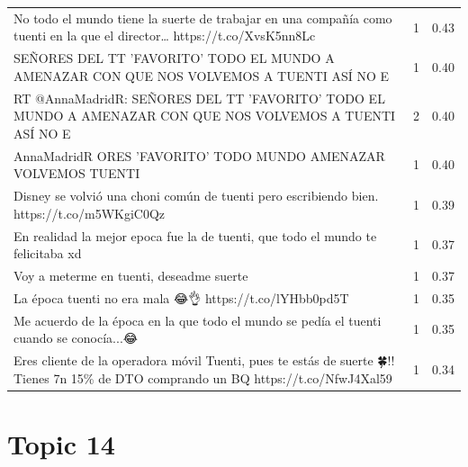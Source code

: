 \begin{longtable}{p{12.5cm}rr}
No todo el mundo tiene la suerte de trabajar en una compañía como tuenti en la que el director… https://t.co/XvsK5nn8Lc & 1 & 0.43 \\
SEÑORES DEL TT 'FAVORITO' TODO EL MUNDO A AMENAZAR CON QUE NOS VOLVEMOS A TUENTI ASÍ NO E & 1 & 0.40 \\
RT @AnnaMadridR: SEÑORES DEL TT 'FAVORITO' TODO EL MUNDO A AMENAZAR CON QUE NOS VOLVEMOS A TUENTI ASÍ NO E & 2 & 0.40 \\
AnnaMadridR ORES 'FAVORITO' TODO MUNDO AMENAZAR VOLVEMOS TUENTI & 1 & 0.40 \\
Disney se volvió una choni común de tuenti pero escribiendo bien. https://t.co/m5WKgiC0Qz & 1 & 0.39 \\
En realidad la mejor epoca fue la de tuenti, que todo el mundo te felicitaba xd & 1 & 0.37 \\
Voy a meterme en tuenti, deseadme suerte & 1 & 0.37 \\
La época tuenti no era mala 😂👌 https://t.co/lYHbb0pd5T & 1 & 0.35 \\
Me acuerdo de la época en la que todo el mundo se pedía el tuenti cuando se conocía...😂 & 1 & 0.35 \\
Eres cliente de la operadora móvil Tuenti, pues te estás de suerte 🍀!! Tienes 7n 15\% de DTO comprando un BQ https://t.co/NfwJ4Xal59 & 1 & 0.34 \\

\end{longtable}
\clearpage

\section{Topic 14}

